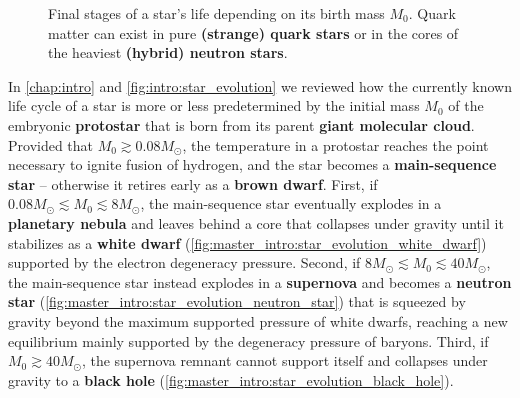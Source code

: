 \begin{figure}[b]
\caption{\label{fig:master_intro:star_evolution_end}%
	Final stages of a star's life depending on its birth mass $M_0$.
	Quark matter can exist in pure \textbf{(strange) quark stars}
	or in the cores of the heaviest \textbf{(hybrid) neutron stars}.
}
\end{figure}

In \cref{chap:intro} and \cref{fig:intro:star_evolution} we reviewed how the currently known life cycle of a star
is more or less predetermined by the initial mass $M_0$ of the embryonic \textbf{protostar} that is born from its parent \textbf{giant molecular cloud}.
Provided that $M_0 \gtrsim 0.08 M_\odot$, the temperature in a protostar reaches the point necessary to ignite fusion of hydrogen, and the star becomes a \textbf{main-sequence star} -- otherwise it retires early as a \textbf{brown dwarf}.
First, if $0.08 M_\odot \lesssim M_0 \lesssim 8 M_\odot$, the main-sequence star eventually explodes in a \textbf{planetary nebula} and leaves behind a core that collapses under gravity until it stabilizes as a \textbf{white dwarf} (\cref{fig:master_intro:star_evolution_white_dwarf}) supported by the electron degeneracy pressure.
Second, if $8 M_\odot \lesssim M_0 \lesssim 40 M_\odot$, the main-sequence star instead explodes in a \textbf{supernova} and becomes a \textbf{neutron star} (\cref{fig:master_intro:star_evolution_neutron_star}) that is squeezed by gravity beyond the maximum supported pressure of white dwarfs, reaching a new equilibrium mainly supported by the degeneracy pressure of baryons.
Third, if $M_0 \gtrsim 40 M_\odot$, the supernova remnant cannot support itself and collapses under gravity to a \textbf{black hole} (\cref{fig:master_intro:star_evolution_black_hole}).

